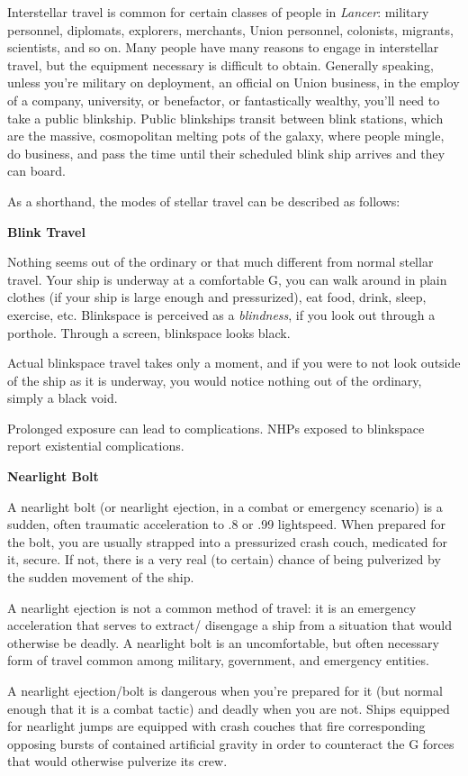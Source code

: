 Interstellar travel is common for certain classes of people in \textit{Lancer}: military personnel,
diplomats, explorers, merchants, Union personnel, colonists, migrants, scientists, and so on.
Many people have many reasons to engage in interstellar travel, but the equipment necessary is
difficult to obtain. Generally speaking, unless you're military on deployment, an official on Union
business, in the employ of a company, university, or benefactor, or fantastically wealthy, you'll
need to take a public blinkship. Public blinkships transit between blink stations, which are the
massive, cosmopolitan melting pots of the galaxy, where people mingle, do business, and pass
the time until their scheduled blink ship arrives and they can board.

As a shorthand, the modes of stellar travel can be described as follows:

\textbf{Blink Travel}

Nothing seems out of the ordinary or that much different from normal stellar travel. Your ship is
underway at a comfortable G, you can walk around in plain clothes (if your ship is large enough
and pressurized), eat food, drink, sleep, exercise, etc. Blinkspace is perceived as a \textit{blindness}, if
you look out through a porthole. Through a screen, blinkspace looks black.

Actual blinkspace travel takes only a moment, and if you were to not look outside of the ship as it
is underway, you would notice nothing out of the ordinary, simply a black void.

Prolonged exposure can lead to complications. NHPs exposed to blinkspace report existential
complications.

\textbf{Nearlight Bolt}

A nearlight bolt (or nearlight ejection, in a combat or emergency scenario) is a sudden, often
traumatic acceleration to .8 or .99 lightspeed. When prepared for the bolt, you are usually
strapped into a pressurized crash couch, medicated for it, secure. If not, there is a very real (to
certain) chance of being pulverized by the sudden movement of the ship.

A nearlight ejection is not a common method of travel: it is an emergency acceleration that
serves to extract/ disengage a ship from a situation that would otherwise be deadly. A nearlight
bolt is an uncomfortable, but often necessary form of travel common among military,
government, and emergency entities.

A nearlight ejection/bolt is dangerous when you're prepared for it (but normal enough that it is a
combat tactic) and deadly when you are not. Ships equipped for nearlight jumps are equipped
with crash couches that fire corresponding opposing bursts of contained artificial gravity in order
to counteract the G forces that would otherwise pulverize its crew.

